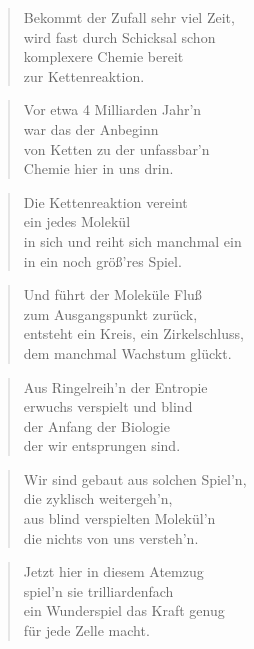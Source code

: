 \documentclass[10pt,a4paper]{article}
\begin{document}
\begin{paracol}{2}
\begin{verse}
Bekommt der Zufall sehr viel Zeit, \\
wird fast durch Schicksal schon \\
komplexere Chemie bereit \\
zur Kettenreaktion. \\
\end{verse}

\begin{verse}
Vor etwa 4 Milliarden Jahr’n \\
war das der Anbeginn \\
von Ketten zu der unfassbar’n \\
Chemie hier in uns drin. \\
\end{verse}

\begin{verse}
Die Kettenreaktion vereint \\
ein jedes Molekül \\
in sich und reiht sich manchmal ein \\
in ein noch größ’res Spiel. \\
\end{verse}

\begin{verse}
Und führt der Moleküle Fluß \\
zum Ausgangspunkt zurück, \\
entsteht ein Kreis, ein Zirkelschluss, \\
dem manchmal Wachstum glückt. \\
\end{verse}

\begin{verse}
Aus Ringelreih’n der Entropie \\
erwuchs verspielt und blind \\
der Anfang der Biologie \\
der wir entsprungen sind. \\
\end{verse}

\begin{verse}
Wir sind gebaut aus solchen Spiel’n, \\
die zyklisch weitergeh’n, \\
aus blind verspielten Molekül’n \\
die nichts von uns versteh’n. \\
\end{verse}

\begin{verse}
Jetzt hier in diesem Atemzug \\
spiel’n sie trilliardenfach \\
ein Wunderspiel das Kraft genug \\
für jede Zelle macht. \\
\end{verse}


\end{paracol}
\end{document}
